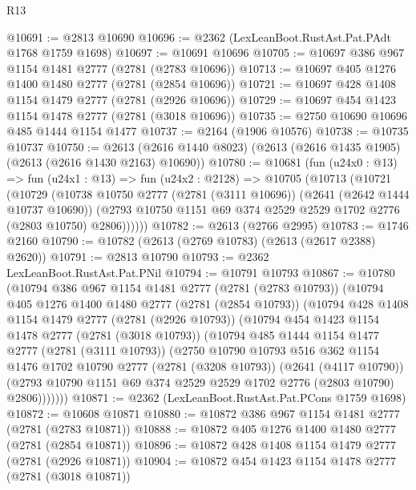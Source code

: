 \begin{lexlean}{R13}
\begin{coremodule}
@10691 := @2813 @10690
@10696 := @2362 (LexLeanBoot.RustAst.Pat.PAdt @1768 @1759 @1698)
@10697 := @10691 @10696
@10705 := @10697 @386 @967 @1154 @1481 @2777 (@2781 (@2783 @10696))
@10713 := @10697 @405 @1276 @1400 @1480 @2777 (@2781 (@2854 @10696))
@10721 := @10697 @428 @1408 @1154 @1479 @2777 (@2781 (@2926 @10696))
@10729 := @10697 @454 @1423 @1154 @1478 @2777 (@2781 (@3018 @10696))
@10735 := @2750 @10690 @10696 @485 @1444 @1154 @1477
@10737 := @2164 (@1906 @10576)
@10738 := @10735 @10737
@10750 := @2613 (@2616 @1440 @8023) (@2613 (@2616 @1435 @1905) (@2613 (@2616 @1430 @2163) @10690))
@10780 := @10681
    (fun (u24x0 : @13) =>
    fun (u24x1 : @13) =>
    fun (u24x2 : @2128) =>
    @10705
      (@10713
        (@10721
          (@10729
            (@10738
              @10750
              @2777
              (@2781 (@3111 @10696))
              (@2641 (@2642 @1444 @10737 @10690))
              (@2793 @10750 @1151 @69 @374 @2529 @2529 @1702 @2776 (@2803 @10750) @2806))))))
@10782 := @2613 (@2766 @2995)
@10783 := @1746 @2160
@10790 := @10782 (@2613 (@2769 @10783) (@2613 (@2617 @2388) @2620))
@10791 := @2813 @10790
@10793 := @2362 LexLeanBoot.RustAst.Pat.PNil
@10794 := @10791 @10793
@10867 := @10780
    (@10794
      @386
      @967
      @1154
      @1481
      @2777
      (@2781 (@2783 @10793))
      (@10794
        @405
        @1276
        @1400
        @1480
        @2777
        (@2781 (@2854 @10793))
        (@10794
          @428
          @1408
          @1154
          @1479
          @2777
          (@2781 (@2926 @10793))
          (@10794
            @454
            @1423
            @1154
            @1478
            @2777
            (@2781 (@3018 @10793))
            (@10794
              @485
              @1444
              @1154
              @1477
              @2777
              (@2781 (@3111 @10793))
              (@2750
                @10790
                @10793
                @516
                @362
                @1154
                @1476
                @1702
                @10790
                @2777
                (@2781 (@3208 @10793))
                (@2641 (@4117 @10790))
                (@2793 @10790 @1151 @69 @374 @2529 @2529 @1702 @2776 (@2803 @10790) @2806)))))))
@10871 := @2362 (LexLeanBoot.RustAst.Pat.PCons @1759 @1698)
@10872 := @10608 @10871
@10880 := @10872 @386 @967 @1154 @1481 @2777 (@2781 (@2783 @10871))
@10888 := @10872 @405 @1276 @1400 @1480 @2777 (@2781 (@2854 @10871))
@10896 := @10872 @428 @1408 @1154 @1479 @2777 (@2781 (@2926 @10871))
@10904 := @10872 @454 @1423 @1154 @1478 @2777 (@2781 (@3018 @10871))

\end{coremodule}
\end{lexlean}
